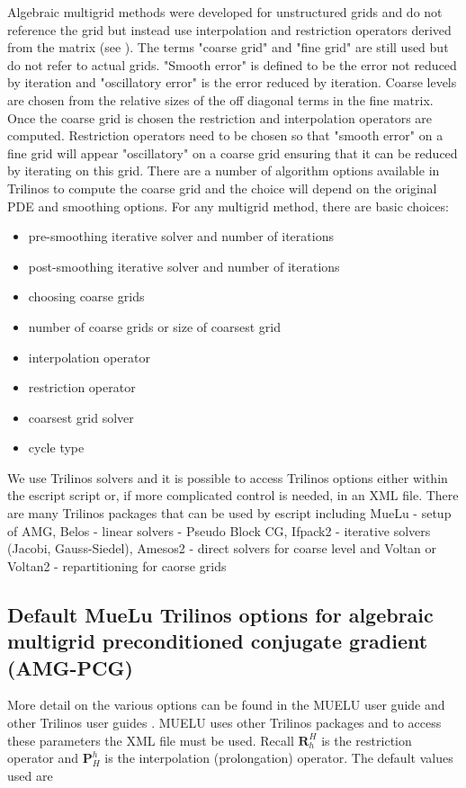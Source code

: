 Algebraic multigrid methods were developed for unstructured grids and do not reference the grid but instead use interpolation and restriction operators derived from the matrix (see \cite{Briggs2000, Stuben2001281, Vanek1996, Tuminaro2000}).  The terms "coarse grid" and "fine grid" are still used but do not refer to actual grids.  "Smooth error" is defined to be the error not reduced by iteration and "oscillatory error" is the error reduced by iteration.  Coarse levels are chosen from the relative sizes of the off diagonal terms in the fine matrix.
Once the coarse grid is chosen the restriction and interpolation operators are computed. Restriction operators need to be chosen so that "smooth error" on a fine grid will appear "oscillatory" on a coarse grid ensuring that it can be reduced by iterating on this grid. There are a number of algorithm options available in Trilinos to compute the coarse grid and the choice will depend on the original PDE and smoothing options. For any multigrid method, there are basic choices: 
\begin{itemize}%
    \item pre-smoothing iterative solver and number of iterations 
    \item post-smoothing iterative solver and number of iterations
    \item choosing coarse grids    
    \item number of coarse grids or size of coarsest grid
    \item interpolation operator
    \item restriction operator
    \item coarsest grid solver
    \item cycle type 
\end{itemize}
We use Trilinos solvers and it is possible to access Trilinos options either within the escript script or, if more complicated control is needed, in an XML file. There are many Trilinos packages that can be used by escript including 
MueLu   - setup of AMG, Belos   - linear solvers - Pseudo Block CG, Ifpack2 - iterative solvers (Jacobi, Gauss-Siedel), Amesos2 - direct solvers for coarse level and Voltan or Voltan2 - repartitioning for caorse grids


\subsection{Default MueLu Trilinos options for algebraic multigrid preconditioned conjugate gradient (AMG-PCG)}
More detail on the various options can be found in the MUELU user guide and other Trilinos user guides \cite{TrilinosWeb}. MUELU uses other Trilinos packages and to access these parameters the XML file must be used.  
Recall $\mathbf{R}_h^H$ is the restriction operator and $\mathbf{P}^h_H$ is the interpolation (prolongation) operator.  The default values used are

